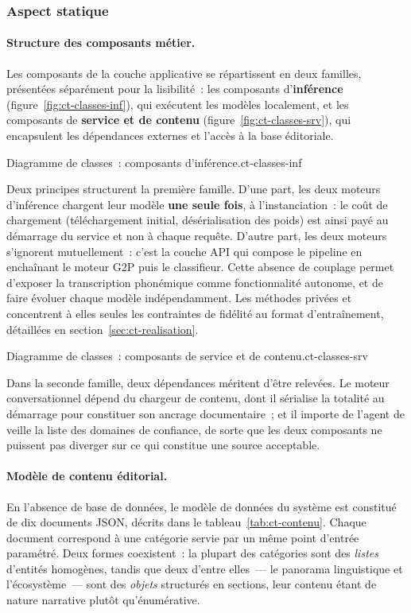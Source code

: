 \subsubsection{Aspect statique}

\paragraph{Structure des composants métier.}
Les composants de la couche applicative se répartissent en deux familles, présentées
séparément pour la lisibilité~: les composants d'\textbf{inférence}
(figure~\ref{fig:ct-classes-inf}), qui exécutent les modèles localement, et les
composants de \textbf{service et de contenu} (figure~\ref{fig:ct-classes-srv}), qui
encapsulent les dépendances externes et l'accès à la base éditoriale.

{Diagramme de classes~: composants d'inférence.}{ct-classes-inf}

Deux principes structurent la première famille. D'une part, les deux moteurs
d'inférence chargent leur modèle \textbf{une seule fois}, à l'instanciation~: le coût
de chargement (téléchargement initial, désérialisation des poids) est ainsi payé au
démarrage du service et non à chaque requête. D'autre part, les deux moteurs
s'ignorent mutuellement~: c'est la couche API qui compose le pipeline en enchaînant le
moteur G2P puis le classifieur. Cette absence de couplage permet d'exposer la
transcription phonémique comme fonctionnalité autonome, et de faire évoluer chaque
modèle indépendamment. Les méthodes privées  et
 concentrent à elles seules les contraintes de fidélité au
format d'entraînement, détaillées en section~\ref{sec:ct-realisation}.

{Diagramme de classes~: composants de service et de contenu.}{ct-classes-srv}

Dans la seconde famille, deux dépendances méritent d'être relevées. Le moteur
conversationnel dépend du chargeur de contenu, dont il sérialise la totalité au
démarrage pour constituer son ancrage documentaire~; et il importe de l'agent de
veille la liste des domaines de confiance, de sorte que les deux composants ne
puissent pas diverger sur ce qui constitue une source acceptable.

\paragraph{Modèle de contenu éditorial.}
En l'absence de base de données, le modèle de données du système est constitué de
dix documents JSON, décrits dans le tableau~\ref{tab:ct-contenu}. Chaque document
correspond à une catégorie servie par un même point d'entrée paramétré. Deux formes
coexistent~: la plupart des catégories sont des \textit{listes} d'entités homogènes,
tandis que deux d'entre elles~--- le panorama linguistique et l'écosystème~--- sont
des \textit{objets} structurés en sections, leur contenu étant de nature narrative
plutôt qu'énumérative.


